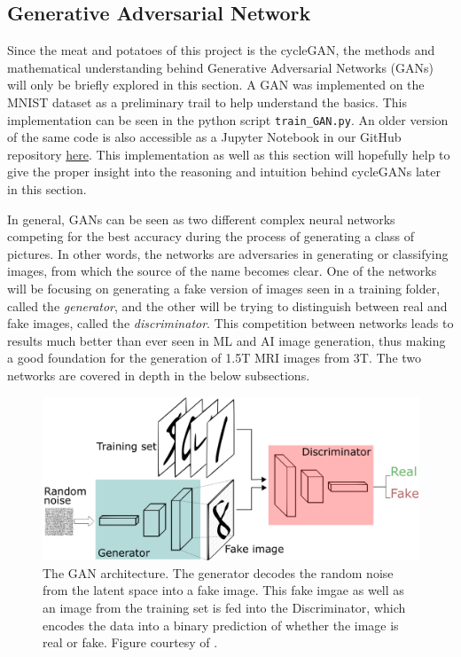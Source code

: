\documentclass[12pt, fleqn, titlepage]{article}
\begin{document}
\subsection{Generative Adversarial Network}\label{gan}
Since the meat and potatoes of this project is the cycleGAN, the methods and mathematical understanding behind Generative Adversarial Networks (GANs) will only be briefly explored in this section. A GAN was implemented on the MNIST dataset as a preliminary trail to help understand the basics. This implementation can be seen in the python script \texttt{train\_GAN.py}. An older version of the same code is also accessible as a Jupyter Notebook in our GitHub repository  \href{https://github.com/oskarwiese/AlzPred/blob/main/preliminary/GAN_MNIST.ipynb}{here}. This implementation as well as this section will hopefully help to give the proper insight into the reasoning and intuition behind cycleGANs later in this section.

In general, GANs can be seen as two different complex neural networks competing for the best accuracy during  the process of generating a class of pictures. In other words, the networks are adversaries in generating or classifying images, from which the source of the name becomes clear. One of the networks will be focusing on generating a fake version of images seen in a training folder, called the \textit{generator}, and the other will be trying to distinguish between real and fake images, called the \textit{discriminator}. This competition between networks leads to results much better than ever seen in ML and AI image generation, thus making a good foundation for the generation of 1.5T MRI images from 3T. The two networks are covered in depth in the below subsections.
\begin{figure}[H]
	\centering
	\includegraphics[width=0.7\linewidth]{"imgs/GAN architecture"}
	\caption{The GAN architecture. The generator decodes the random noise from the latent space into a fake image. This fake imgae as well as an image from the training set is fed into the Discriminator, which encodes the data into a binary prediction of whether the image is real or fake. Figure courtesy of \cite{gan_introduction_towards_datascience}.}
	\label{fig:gan-architecture}
\end{figure}
\end{document}
